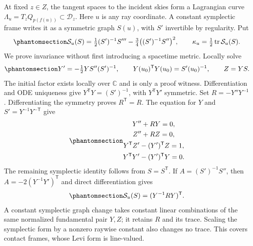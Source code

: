 \documentclass[
  english,
  11pt,
  reqno]{amsart}
\begin{document}
At fixed \(z\in Z\), the tangent spaces to the incident skies form a
Lagrangian curve \(\Lambda_u=T_zQ_{p(f(u))}\subset\mathcal D_z\). Here
\(u\) is any ray coordinate. A constant symplectic frame writes it as a
symmetric graph \(S(u)\), with \(S'\) invertible by regularity. Put
\begin{equation}\protect\phantomsection\label{eq:gg-intrinsic-matrix-schwarzian}{
 \mathcal S_u(S)=
       \tfrac12(S')^{-1}S'''
       -\tfrac34\big((S')^{-1}S''\big)^2,\qquad
 \kappa_u=\tfrac12\operatorname{tr}\mathcal S_u(S).
}\end{equation} We prove invariance without first introducing a
spacetime metric. Locally solve
\begin{equation}\protect\phantomsection\label{eq:gg-intrinsic-jacobi-normalization}{
 Y'=-\tfrac12YS''(S')^{-1},\qquad
 Y(u_0)^{\mathsf T}Y(u_0)=S'(u_0)^{-1},
 \qquad Z=YS .
}\end{equation} The initial factor exists locally over \(\mathbb C\) and
is only a proof witness. Differentiation and ODE uniqueness give
\(Y^{\mathsf T}Y=(S')^{-1}\), with \(Y^{\mathsf T}Y'\) symmetric. Set
\(R=-Y''Y^{-1}\). Differentiating the symmetry proves
\(R^{\mathsf T}=R\). The equation for \(Y\) and
\(S'=Y^{-1}Y^{-{\mathsf T}}\) give
\begin{equation}\protect\phantomsection\label{eq:gg-intrinsic-jacobi-identities}{\begin{gathered}
Y''+RY=0, \\
Z''+RZ=0, \\
Y^{\mathsf T}Z'-(Y')^{\mathsf T}Z=1, \\
Y^{\mathsf T}Y'-(Y')^{\mathsf T}Y=0 .
\end{gathered}}\end{equation} The remaining symplectic identity follows from
\(S=S^{\mathsf T}\). If \(A=(S')^{-1}S''\), then
\(A=-2(Y^{-1}Y')^{\mathsf T}\) and direct differentiation gives
\begin{equation}\protect\phantomsection\label{eq:gg-intrinsic-schwarzian-conjugacy}{
 \mathcal S_u(S)=(Y^{-1}RY)^{\mathsf T}.
}\end{equation} A constant symplectic graph change takes constant linear
combinations of the same normalized fundamental pair \(Y,Z\); it retains
\(R\) and its trace. Scaling the symplectic form by a nonzero raywise
constant also changes no trace. This covers contact frames, whose Levi
form is line-valued.
\end{document}
